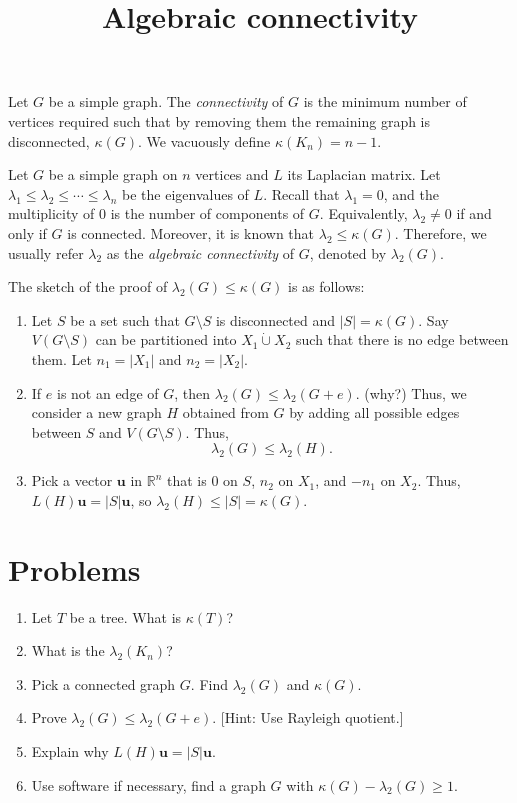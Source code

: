 \documentclass{article}
\title{Algebraic connectivity}
\date{\vspace{-1cm}}
\newcommand{\dunion}{\mathbin{\dot\cup}}
\newcommand{\bu}{\mathbf{u}}
\theoremstyle{definition}
\begin{document}
\maketitle
\large

Let $G$ be a simple graph.  The \emph{connectivity} of $G$ is the minimum number of vertices required such that by removing them the remaining graph is disconnected, $\kappa(G)$.  We vacuously define $\kappa(K_n) = n-1$.  

Let $G$ be a simple graph on $n$ vertices and $L$ its Laplacian matrix.  Let $\lambda_1 \leq \lambda_2 \leq \cdots \leq \lambda_n$ be the eigenvalues of $L$.  Recall that $\lambda_1 = 0$, and the multiplicity of $0$ is the number of components of $G$.  Equivalently, $\lambda_2 \neq 0$ if and only if $G$ is connected.  Moreover, it is known that $\lambda_2 \leq \kappa(G)$.  Therefore, we usually refer $\lambda_2$ as the \emph{algebraic connectivity} of $G$, denoted by $\lambda_2(G)$.  

The sketch of the proof of $\lambda_2(G) \leq \kappa(G)$ is as follows:
\begin{enumerate}
\item Let $S$ be a set such that $G\setminus S$ is disconnected and $|S| = \kappa(G)$.  Say $V(G\setminus S)$ can be partitioned into $X_1\dunion X_2$ such that there is no edge between them.  Let $n_1 = |X_1|$ and $n_2 = |X_2|$.  
\item If $e$ is not an edge of $G$, then $\lambda_2(G) \leq \lambda_2(G+e)$. (why?) Thus, we consider a new graph $H$ obtained from $G$ by adding all possible edges between $S$ and $V(G\setminus S)$.  Thus, 
\[\lambda_2(G) \leq \lambda_2(H).\]
\item Pick a vector $\bu$ in $\mathbb{R}^n$ that is $0$ on $S$, $n_2$ on $X_1$, and $-n_1$ on $X_2$.  Thus, $L(H)\bu = |S|\bu$, so $\lambda_2(H) \leq |S| = \kappa(G)$.  
\end{enumerate}

\section*{Problems}
\begin{enumerate}
\setlength\itemsep{2em}
\item Let $T$ be a tree.  What is $\kappa(T)$?    
\item What is the $\lambda_2(K_n)$?  
\item Pick a connected graph $G$.  Find $\lambda_2(G)$ and $\kappa(G)$. 
\item Prove $\lambda_2(G) \leq \lambda_2(G + e)$.  [Hint: Use Rayleigh quotient.]
\item Explain why $L(H)\bu = |S|\bu$.  
\item Use software if necessary, find a graph $G$ with $\kappa(G) - \lambda_2(G) \geq 1$.  
\end{enumerate}

\end{document}
